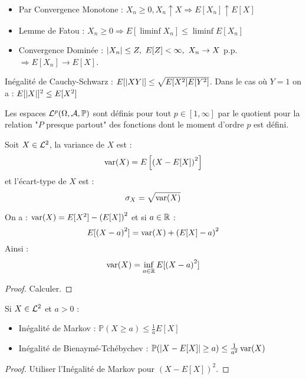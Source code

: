 \documentclass{cours}
\begin{document}
\begin{proposition}
    \begin{itemize}
        \item Par Convergence Monotone : $X_{n} \geq 0, X_{n} \uparrow X \Rightarrow E[X_{n}] \uparrow E[X]$
        \item Lemme de Fatou : $X_{n} \geq 0 \Rightarrow E[\liminf X_{n}] \leq \liminf E[X_{n}]$
        \item Convergence Dominée : $\left|X_{n}\right| \leq Z, \ E[Z] < \infty, \ X_{n} \rightarrow X$ p.p. $\Rightarrow E[X_{n}] \rightarrow E[X]$.
    \end{itemize}
\end{proposition}

\begin{proposition}
    Inégalité de Cauchy-Schwarz : $E[\left|XY\right|] \leq \sqrt{E[X^{2}]E[Y^{2}]}$. Dans le cas où $Y = 1$ on a : $E[\left|X\right|]^{2} \leq E[X^{2}]$
\end{proposition}

Les espaces $\mathcal{L}^{p}(\Omega, \mathcal{A}, \mathbb{P})$ sont définis pour tout $p \in \left[1, \infty\right]$ par le quotient pour la relation "$P$ presque partout" des fonctions dont le moment d'ordre $p$ est défini.

\begin{definition}
    Soit $X \in \mathcal{L}^{2}$, la variance de $X$ est :
    \[
        \operatorname{var}(X) = E\left[\left(X - E[X]\right)^{2}\right]
    \]
    et l'écart-type de $X$ est :
    \[
        \sigma_{X} = \sqrt{\operatorname{var}(X)}
    \]
\end{definition}

\begin{proposition}
    On a : $\operatorname{var}(X) = E[X^{2}] - \left(E[X]\right)^{2}$ et si $a \in \mathbb{R}$ :
    \[
        E[\left(X - a\right)^{2}] = \operatorname{var}(X) + \left(E[X] - a\right)^{2}
    \]
    Ainsi :
    \[
        \operatorname{var}(X) = \inf_{a\in \mathbb{R}} E[\left(X - a\right)^{2}]
    \]
\end{proposition}
\begin{proof}
    Calculer.
\end{proof}


\begin{proposition}
    Si $X \in \mathcal{L}^{2}$ et $a > 0$ :
    \begin{itemize}
        \item Inégalité de Markov : $\mathbb{P}(X \geq a) \leq \frac{1}{a}E[X]$
        \item Inégalité de Bienaymé-Tchébychev : $\mathbb{P}(\left|X - E[X]\right| \geq a) \leq \frac{1}{a^{2}}\operatorname{var}(X)$
    \end{itemize}
\end{proposition}
\begin{proof}
    Utiliser l'Inégalité de Markov pour $\left(X - E[X]\right)^{2}$.
\end{proof}
\end{document}
